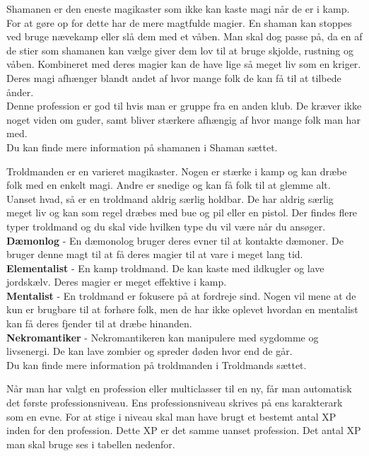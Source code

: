 \begin{prof*}
Shamanen er den eneste magikaster som ikke kan kaste magi når de er i kamp. For at gøre op for dette har de mere magtfulde magier. En shaman kan stoppes ved bruge nævekamp eller slå dem med et våben. Man skal dog passe på, da en af de stier som shamanen kan vælge giver dem lov til at bruge skjolde, rustning og våben. Kombineret med deres magier kan de have lige så meget liv som en kriger. Deres magi afhænger blandt andet af hvor mange folk de kan få til at tilbede ånder.\\
Denne profession er god til hvis man er gruppe fra en anden klub. De kræver ikke noget viden om guder, samt bliver stærkere afhængig af hvor mange folk man har med.\\
Du kan finde mere information på shamanen i Shaman sættet.
\end{prof*}

\begin{prof*}
Troldmanden er en varieret magikaster. Nogen er stærke i kamp og kan dræbe folk med en enkelt magi. Andre er snedige og kan få folk til at glemme alt. Uanset hvad, så er en troldmand aldrig særlig holdbar. De har aldrig særlig meget liv og kan som regel dræbes med bue og pil eller en pistol. Der findes flere typer troldmand og du skal vide hvilken type du vil være når du ansøger.\\
\textbf{Dæmonlog} - En dæmonolog bruger deres evner til at kontakte dæmoner. De bruger denne magt til at få deres magier til at vare i meget lang tid.\\
\textbf{Elementalist} - En kamp troldmand. De kan kaste med ildkugler og lave jordskælv. Deres magier er meget effektive i kamp.\\
\textbf{Mentalist} - En troldmand er fokusere på at fordreje sind. Nogen vil mene at de kun er brugbare til at forhøre folk, men de har ikke oplevet hvordan en mentalist kan få deres fjender til at dræbe hinanden.\\
\textbf{Nekromantiker} - Nekromantikeren kan manipulere med sygdomme og livsenergi. De kan lave zombier og spreder døden hvor end de går.\\
Du kan finde mere information på troldmanden i Troldmands sættet.
\end{prof*}

Når man har valgt en profession eller multiclasser til en ny, får man automatisk det første professionsniveau. Ens professionsniveau skrives på ens karakterark som en evne. For at stige i niveau skal man have brugt et bestemt antal XP inden for den profession. Dette XP er det samme uanset profession.
Det antal XP man skal bruge ses i tabellen nedenfor.


